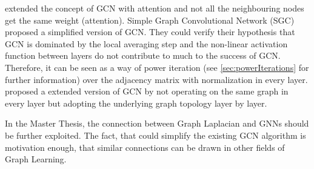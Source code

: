 \citet{GAT} extended the concept of GCN with attention and not all the neighbouring nodes get the same weight (attention).
Simple Graph Convolutional Network (SGC) \cite{simpleGCN} proposed a simplified version of GCN.
They could verify their hypothesis that GCN is dominated by the local averaging step and the non-linear 
activation function between layers do not contribute to much to the success of GCN. 
Therefore, it can be seen as a way of power iteration (see \ref{sec:powerIterations} for further information) over the adjacency matrix with normalization in every layer.
\citet{dynamicGCN} proposed a extended version of GCN by not operating on the same graph in every layer but adopting
the underlying graph topology layer by layer.

\begin{tcolorbox}[colback=red!5!white,colframe=red!75!black]
    In the Master Thesis, the connection between Graph Laplacian and GNNs should be further exploited.
    The fact, that \cite{simpleGCN} could simplify the existing GCN algorithm is motivation enough,
    that similar connections can be drawn in other fields of Graph Learning.
\end{tcolorbox}

